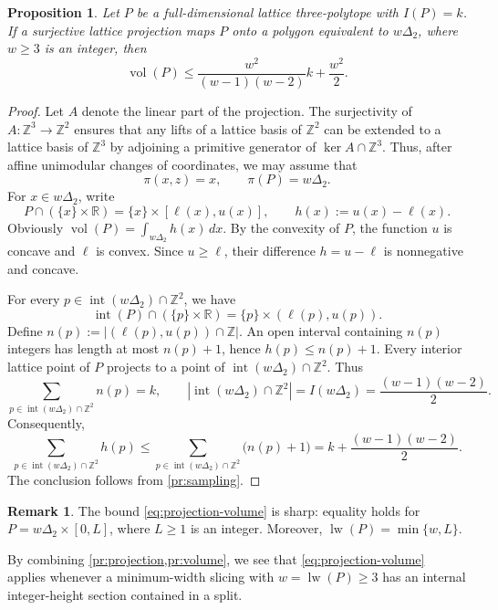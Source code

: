 \documentclass[reqno, 11pt]{article}
\numberwithin{equation}{section}
\newtheorem{proposition}[proposition]{Proposition}
\theoremstyle{definition}
\newtheorem{remark}[remark]{Remark}
\newcommand{\R}{\mathbb R}
\newcommand{\Z}{\mathbb Z}
\DeclareMathOperator{\Int}{int}
\DeclareMathOperator{\vol}{vol}
\DeclareMathOperator{\lw}{lw}
\numberwithin{equation}{section}
\begin{document}
\begin{proposition}\label{pr:volume}
Let $P$ be a full-dimensional lattice three-polytope with $I(P)=k$.
If a surjective lattice projection maps $P$ onto a polygon equivalent to $w\Delta_2$, where $w\ge3$ is an integer, then
\begin{equation}\label{eq:projection-volume}
 \vol(P)\le\frac{w^2}{(w-1)(w-2)}k+\frac{w^2}{2}.
\end{equation}
\end{proposition}
\begin{proof}
Let $A$ denote the linear part of the projection. The surjectivity of $A:\mathbb Z^3\to\mathbb Z^2$ ensures that any lifts of a lattice basis of $\mathbb Z^2$ can be extended to a lattice basis of $\mathbb Z^3$ by adjoining a primitive generator of $\ker A\cap\mathbb Z^3$.
Thus, after affine unimodular changes of coordinates,
we may assume that
\[
 \pi(x,z)=x, \qquad \pi(P)=w\Delta_2.
\]
For $x\in w\Delta_2$, write
\[
 P\cap(\{x\}\times\R)
 =\{x\}\times[\ell(x),u(x)],
 \qquad h(x):=u(x)-\ell(x).
\]
Obviously $\vol(P)=\int_{w\Delta_2} h(x)\,dx$. By the convexity of $P$, the function $u$ is concave and $\ell$ is convex. Since $u\ge\ell$, their difference $h=u-\ell$ is nonnegative and concave.

For every $p\in\Int(w\Delta_2)\cap\Z^2$, we have
\[
 \Int(P)\cap(\{p\}\times\R) =\{p\}\times(\ell(p),u(p)).
\]
Define
$n(p):=\bigl|(\ell(p),u(p))\cap\Z\bigr|.$
An open interval containing $n(p)$ integers has length
at most $n(p)+1$, hence
$h(p)\le n(p)+1$.
Every interior lattice point of $P$ projects to a point of $\Int(w\Delta_2)\cap\Z^2$. Thus 
\[
 \sum_{p\in\Int(w\Delta_2)\cap\Z^2}n(p)=k,
 \qquad
 |\Int(w\Delta_2)\cap\Z^2|=I(w\Delta_2)=\frac{(w-1)(w-2)}2.
\]
Consequently,
\[
 \sum_{p\in\Int(w\Delta_2)\cap\Z^2}h(p)
 \le \sum_{p\in\Int(w\Delta_2)\cap\Z^2}\bigl(n(p)+1\bigr)
 =k+\frac{(w-1)(w-2)}2.
\]
The conclusion follows from \cref{pr:sampling}.
\end{proof}


\begin{remark}
The bound \eqref{eq:projection-volume} is sharp: equality holds for $P=w\Delta_2\times[0,L]$,
where $L\ge1$ is an integer.
Moreover, $\lw(P)=\min\{w,L\}$.
\end{remark}

By combining \cref{pr:projection,pr:volume}, we see that
\eqref{eq:projection-volume} applies whenever a minimum-width
slicing with $w=\lw(P)\ge3$ has an internal integer-height
section contained in a split.
\end{document}
